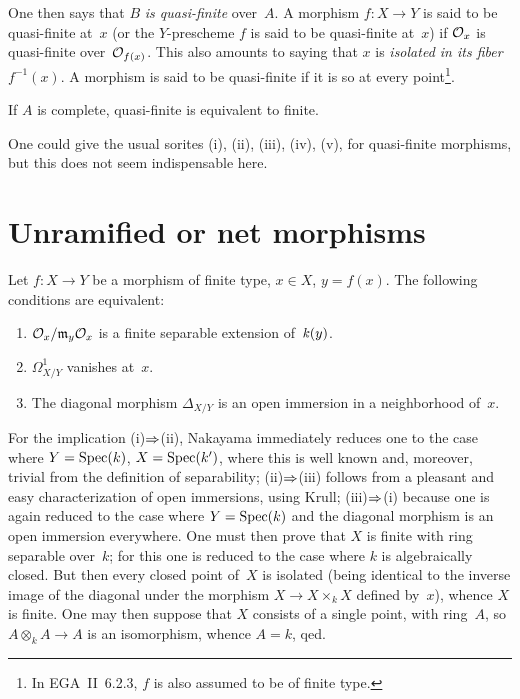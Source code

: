 One then says
that $B$ \emph{is quasi-finite} over~$A$. A morphism $f\colon X\to Y$
is said to be quasi-finite at~$x$ (or the $Y$-prescheme $f$ is said
to be quasi-finite at~$x$) if $\cal{O}_x$ is quasi-finite
over~$\cal{O}_{f(x)}$. This also amounts to saying that $x$ is
\emph{isolated in its fiber}~$f^{-1}(x)$. A morphism is said to be
quasi-finite if it is so at every point\footnote{In EGA~II~6.2.3,
$f$ is also assumed to be of finite type.}.

\begin{corollary}
\label{I.2.2}
If $A$ is complete, quasi-finite is equivalent to finite.
\end{corollary}

One could give the usual sorites \textup{(i), (ii), (iii), (iv), (v),}
for quasi-finite morphisms, but this does not seem indispensable here.

\section{Unramified or net morphisms}
\label{I.3}

\begin{proposition}
\label{I.3.1}
Let $f\colon X\to Y$ be a morphism of finite type, $x\in X$,
$y=f(x)$. The following conditions are equivalent:
\begin{enumerate}
\item[(i)] $\cal{O}_x/\goth{m}_y\cal{O}_x$ is a finite separable
extension of~$\kres(y)$.
\item[(ii)] $\mathit{\Omega}^1_{X/Y}$ vanishes at~$x$.
\item[(iii)] The diagonal morphism $\Delta_{X/Y}$ is an open
immersion in a neighborhood of~$x$.
\end{enumerate}
\end{proposition}

For the implication (i)$\To$(ii), Nakayama immediately reduces
one to the case where $Y=\Spec(k)$, $X=\Spec(k')$, where this is
well known and, moreover, trivial from the definition of separability;
(ii)$\To$(iii) follows from a pleasant and easy characterization
of open immersions, using Krull; (iii)$\To$(i) because one is again
reduced to the case where $Y=\Spec(k)$ and the diagonal morphism
is an open immersion everywhere. One must then prove that $X$ is
finite with ring separable over~$k$; for this one is reduced to
the case where $k$ is algebraically closed. But then every closed
point of~$X$ is isolated (being identical to the inverse image of
the diagonal under the morphism $X\to X\times_k X$ defined by~$x$),
whence $X$ is finite. One may then suppose that $X$ consists of
a single point, with ring~$A$, so $A\otimes_k A\to A$ is an
isomorphism, whence $A=k$, qed.


